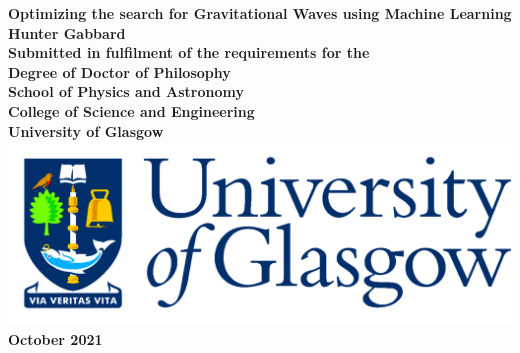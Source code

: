 \documentclass[12pt,titlepage,oneside]{book}
\begin{document}
\begin{titlepage}
\centering
\vspace*{3cm}  %
\bfseries\Large
Optimizing the search for Gravitational Waves using Machine Learning \\
\vspace{3cm}
\normalfont\large
Hunter Gabbard\\
\vspace{2cm}
Submitted in fulfilment of the requirements for the\\
Degree of Doctor of Philosophy\\
\vspace{2cm}
School of Physics and Astronomy\\
College of Science and Engineering\\
University of Glasgow\\
\vspace{1cm}
\includegraphics[scale=0.125]{GlaLogo.pdf}
\\
\vspace{1cm}
October 2021
\end{titlepage}
\frontmatter  %

\tableofcontents
\listoftables
\listoffigures



\mainmatter %




%




%

\backmatter  %
%



\end{document}

